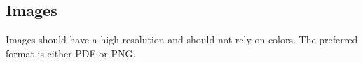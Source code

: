 \documentclass[12pt,a4paper,oneside]{article}
\begin{document}
\subsection*{Images}

Images should have a high resolution and should not rely on colors. The preferred format is either PDF or PNG.


\nocite{*}


\end{document}
